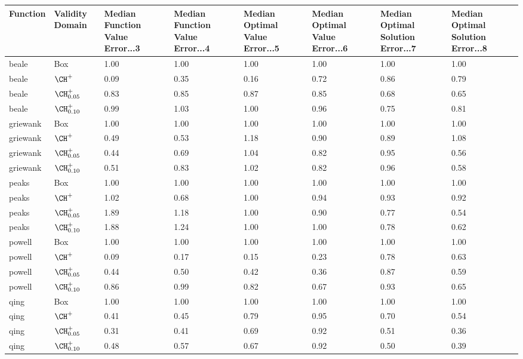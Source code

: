 \begin{table}[ht]
\centering
\begin{tabular}{llllllll}
  \hline
Function & Validity Domain & Median Function Value Error...3 & Median Function Value Error...4 & Median Optimal Value Error...5 & Median Optimal Value Error...6 & Median Optimal Solution Error...7 & Median Optimal Solution Error...8 \\ 
  \hline
beale & {\sc Box} & 1.00 & 1.00 & 1.00 & 1.00 & 1.00 & 1.00 \\ 
  beale & $\CH^+$ & 0.09 & 0.35 & 0.16 & 0.72 & 0.86 & 0.79 \\ 
  beale & $\CH^+_{0.05}$ & 0.83 & 0.85 & 0.87 & 0.85 & 0.68 & 0.65 \\ 
  beale & $\CH^+_{0.10}$ & 0.99 & 1.03 & 1.00 & 0.96 & 0.75 & 0.81 \\ 
  griewank & {\sc Box} & 1.00 & 1.00 & 1.00 & 1.00 & 1.00 & 1.00 \\ 
  griewank & $\CH^+$ & 0.49 & 0.53 & 1.18 & 0.90 & 0.89 & 1.08 \\ 
  griewank & $\CH^+_{0.05}$ & 0.44 & 0.69 & 1.04 & 0.82 & 0.95 & 0.56 \\ 
  griewank & $\CH^+_{0.10}$ & 0.51 & 0.83 & 1.02 & 0.82 & 0.96 & 0.58 \\ 
  peaks & {\sc Box} & 1.00 & 1.00 & 1.00 & 1.00 & 1.00 & 1.00 \\ 
  peaks & $\CH^+$ & 1.02 & 0.68 & 1.00 & 0.94 & 0.93 & 0.92 \\ 
  peaks & $\CH^+_{0.05}$ & 1.89 & 1.18 & 1.00 & 0.90 & 0.77 & 0.54 \\ 
  peaks & $\CH^+_{0.10}$ & 1.88 & 1.24 & 1.00 & 1.00 & 0.78 & 0.62 \\ 
  powell & {\sc Box} & 1.00 & 1.00 & 1.00 & 1.00 & 1.00 & 1.00 \\ 
  powell & $\CH^+$ & 0.09 & 0.17 & 0.15 & 0.23 & 0.78 & 0.63 \\ 
  powell & $\CH^+_{0.05}$ & 0.44 & 0.50 & 0.42 & 0.36 & 0.87 & 0.59 \\ 
  powell & $\CH^+_{0.10}$ & 0.86 & 0.99 & 0.82 & 0.67 & 0.93 & 0.65 \\ 
  qing & {\sc Box} & 1.00 & 1.00 & 1.00 & 1.00 & 1.00 & 1.00 \\ 
  qing & $\CH^+$ & 0.41 & 0.45 & 0.79 & 0.95 & 0.70 & 0.54 \\ 
  qing & $\CH^+_{0.05}$ & 0.31 & 0.41 & 0.69 & 0.92 & 0.51 & 0.36 \\ 
  qing & $\CH^+_{0.10}$ & 0.48 & 0.57 & 0.67 & 0.92 & 0.50 & 0.39 \\ 

\end{tabular}
\end{table}
